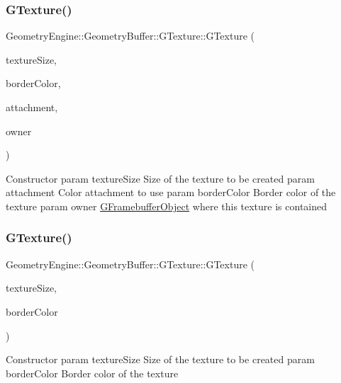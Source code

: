 \subsubsection{\texorpdfstring{GTexture()}{GTexture()}\hspace{0.1cm}{\footnotesize\ttfamily [1/6]}}
{\footnotesize\ttfamily Geometry\+Engine\+::\+Geometry\+Buffer\+::\+G\+Texture\+::\+G\+Texture (\begin{DoxyParamCaption}\item[{const Q\+Vector2D \&}]{texture\+Size,  }\item[{const Q\+Vector3D \&}]{border\+Color,  }\item[{G\+Framebuffer\+Commons\+::\+G\+\_\+\+C\+O\+L\+O\+R\+\_\+\+A\+T\+T\+A\+C\+H\+M\+E\+N\+TS}]{attachment,  }\item[{const \mbox{\hyperlink{class_geometry_engine_1_1_geometry_buffer_1_1_g_framebuffer_object}{G\+Framebuffer\+Object}} $\ast$}]{owner }\end{DoxyParamCaption})}

Constructor param texture\+Size Size of the texture to be created param attachment Color attachment to use param border\+Color Border color of the texture param owner \mbox{\hyperlink{class_geometry_engine_1_1_geometry_buffer_1_1_g_framebuffer_object}{G\+Framebuffer\+Object}} where this texture is contained \mbox{\label{class_geometry_engine_1_1_geometry_buffer_1_1_g_texture_a06caa47adf6c43699450c29212dab114}} 
\subsubsection{\texorpdfstring{GTexture()}{GTexture()}\hspace{0.1cm}{\footnotesize\ttfamily [2/6]}}
{\footnotesize\ttfamily Geometry\+Engine\+::\+Geometry\+Buffer\+::\+G\+Texture\+::\+G\+Texture (\begin{DoxyParamCaption}\item[{const Q\+Vector2D \&}]{texture\+Size,  }\item[{const Q\+Vector3D \&}]{border\+Color }\end{DoxyParamCaption})}

Constructor param texture\+Size Size of the texture to be created param border\+Color Border color of the texture \mbox{\label{class_geometry_engine_1_1_geometry_buffer_1_1_g_texture_a8fa5f02d38154ba8642512e871a8edeb}} 
